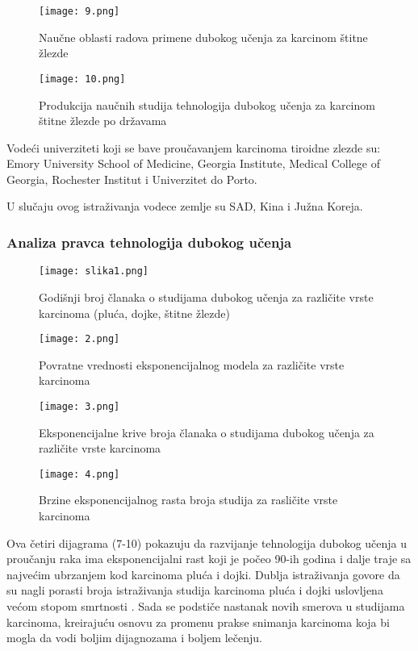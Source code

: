\documentclass[a4paper]{article}
\begin{document}
\begin{figure}[hbt!]
\centering
\texttt{[image: 9.png]}
\caption{Naučne oblasti radova primene dubokog učenja za karcinom štitne žlezde}
\end{figure}

\begin{figure}[hbt!]
\centering
\texttt{[image: 10.png]}
\caption{Produkcija naučnih studija tehnologija dubokog učenja za karcinom štitne žlezde po državama}
\end{figure}

Vodeći univerziteti koji se bave proučavanjem karcinoma tiroidne zlezde su: Emory University School of Medicine, Georgia Institute, Medical College of Georgia, Rochester Institut i Univerzitet do Porto.

U slučaju ovog istraživanja vodece zemlje su SAD, Kina i Južna Koreja.


\FloatBarrier

\subsubsection{Analiza pravca tehnologija dubokog učenja}
\label{subsec:ppnaslov1}

\begin{figure}[hbt!]
\centering
\texttt{[image: slika1.png]}
\caption{Godišnji broj članaka o studijama dubokog učenja za različite vrste karcinoma (pluća, dojke, štitne žlezde)}
\end{figure}

\begin{figure}[hbt!]
\centering
\texttt{[image: 2.png]}
\caption{Povratne vrednosti eksponencijalnog modela za različite vrste karcinoma}
\end{figure}



\begin{figure}[hbt!]
\centering
\texttt{[image: 3.png]}
\caption{Eksponencijalne krive broja članaka o studijama dubokog učenja za različite vrste karcinoma}
\end{figure}

\begin{figure}[hbt!]
\centering
\texttt{[image: 4.png]}
\caption{Brzine eksponencijalnog rasta broja studija za rasličite vrste karcinoma}
\end{figure}

\newline
Ova četiri dijagrama (7-10) pokazuju da razvijanje tehnologija dubokog učenja u proučanju raka ima eksponencijalni rast koji je počeo 90-ih godina i dalje traje sa najvećim ubrzanjem kod karcinoma pluća i dojki. Dublja istraživanja govore da su nagli porasti broja istraživanja studija karcinoma pluća i dojki uslovljena većom stopom smrtnosti \cite{coccia2}. Sada se podstiče nastanak novih smerova u studijama karcinoma, kreirajuću osnovu za promenu prakse snimanja karcinoma koja bi mogla da vodi boljim dijagnozama i boljem lečenju.
\end{document}
